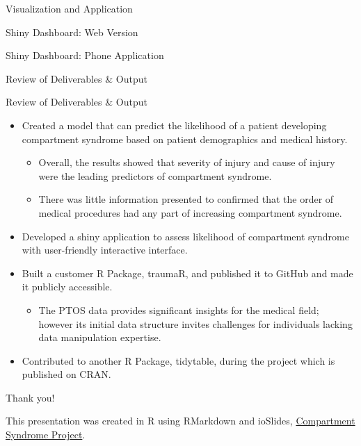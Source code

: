 \documentclass[
  ignorenonframetext,
]{beamer}
\providecommand{\tightlist}{%
  \setlength{\itemsep}{0pt}\setlength{\parskip}{0pt}}
\begin{document}
\begin{frame}{Visualization and Application}
\protect\hypertarget{visualization-and-application}{}

\begin{block}{Shiny Dashboard: Web Version}

\end{block}

\begin{block}{Shiny Dashboard: Phone Application}

\end{block}

\end{frame}

\begin{frame}{Review of Deliverables \& Output}
\protect\hypertarget{review-of-deliverables-output}{}

\begin{block}{Review of Deliverables \& Output}

\begin{itemize}
\tightlist
\item
  Created a model that can predict the likelihood of a patient
  developing compartment syndrome based on patient demographics and
  medical history.

  \begin{itemize}
  \tightlist
  \item
    Overall, the results showed that severity of injury and cause of
    injury were the leading predictors of compartment syndrome.
  \item
    There was little information presented to confirmed that the order
    of medical procedures had any part of increasing compartment
    syndrome.
  \end{itemize}
\item
  Developed a shiny application to assess likelihood of compartment
  syndrome with user-friendly interactive interface.
\item
  Built a customer R Package, traumaR, and published it to GitHub and
  made it publicly accessible.

  \begin{itemize}
  \tightlist
  \item
    The PTOS data provides significant insights for the medical field;
    however its initial data structure invites challenges for
    individuals lacking data manipulation expertise.
  \end{itemize}
\item
  Contributed to another R Package, tidytable, during the project which
  is published on CRAN.
\end{itemize}

\end{block}

\end{frame}

\begin{frame}{Thank you!}
\protect\hypertarget{thank-you}{}

This presentation was created in R using RMarkdown and ioSlides,
\href{https://github.com/mjkarlsen/PTOS-Project}{Compartment Syndrome
Project}.

\end{frame}
\end{document}
